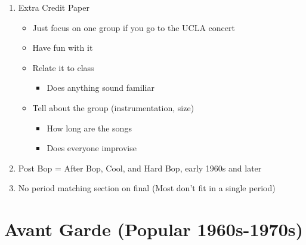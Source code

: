 \documentclass[]{article}
\date{}
\providecommand{\tightlist}{%
  \setlength{\itemsep}{0pt}\setlength{\parskip}{0pt}}
\begin{document}
\begin{enumerate}
\def\labelenumi{\arabic{enumi}.}
\tightlist
\item
  Extra Credit Paper

  \begin{itemize}
  \tightlist
  \item
    Just focus on one group if you go to the UCLA concert
  \item
    Have fun with it
  \item
    Relate it to class

    \begin{itemize}
    \tightlist
    \item
      Does anything sound familiar
    \end{itemize}
  \item
    Tell about the group (instrumentation, size)

    \begin{itemize}
    \tightlist
    \item
      How long are the songs
    \item
      Does everyone improvise
    \end{itemize}
  \end{itemize}
\item
  Post Bop = After Bop, Cool, and Hard Bop, early 1960s and later
\item
  No period matching section on final (Most don't fit in a single
  period)
\end{enumerate}

\section{Avant Garde (Popular
1960s-1970s)}\label{avant-garde-popular-1960s-1970s}
\end{document}
